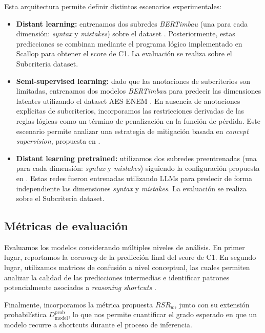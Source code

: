 \documentclass[12pt]{article}
\begin{document}
Esta arquitectura permite definir distintos escenarios experimentales:

\begin{itemize}
\item \textbf{Distant learning:} entrenamos dos subredes \textit{BERTimbau} (una para cada dimensión: \textit{syntax} y \textit{mistakes}) sobre el dataset \cite{propor2024}. Posteriormente, estas predicciones se combinan mediante el programa lógico implementado en Scallop para obtener el score de C1. La evaluación se realiza sobre el Subcriteria dataset.

\item \textbf{Semi-supervised learning:} dado que las anotaciones de subcriterios son limitadas, entrenamos dos modelos \textit{BERTimbau} para predecir las dimensiones latentes utilizando el dataset AES ENEM \cite{propor2024}. En ausencia de anotaciones explícitas de subcriterios, incorporamos las restricciones derivadas de las reglas lógicas como un término de penalización en la función de pérdida. Este escenario permite analizar una estrategia de mitigación basada en \textit{concept supervision}, propuesta en \cite{Marconato2023-NotAll}.

\item \textbf{Distant learning pretrained:} utilizamos dos subredes preentrenadas (una para cada dimensión: \textit{syntax} y \textit{mistakes}) siguiendo la configuración propuesta en \cite{feedbackpropor}. Estas redes fueron entrenadas utilizando LLMs para predecir de forma independiente las dimensiones \textit{syntax} y \textit{mistakes}. La evaluación se realiza sobre el Subcriteria dataset.

\end{itemize}


\subsection{Métricas de evaluación}

Evaluamos los modelos considerando múltiples niveles de análisis. En primer lugar, reportamos la \textit{accuracy} de la predicción final del score de C1. En segundo lugar, utilizamos matrices de confusión a nivel conceptual, las cuales permiten analizar la calidad de las predicciones intermedias e identificar patrones potencialmente asociados a \textit{reasoning shortcuts} \cite{Bortolotti2024}.

Finalmente, incorporamos la métrica propuesta $RSR_w$, junto con su extensión probabilística $D^{\text{prob}}_{\text{model}}$, lo que nos permite cuantificar el grado esperado en que un modelo recurre a shortcuts durante el proceso de inferencia.
\end{document}
